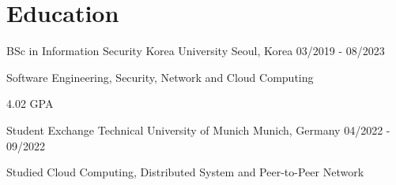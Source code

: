 \vspace{-\acvSectionTopSkip}
\section{Education}
\cventry
{BSc in Information Security} %
{Korea University} %
{Seoul, Korea} %
{03/2019 - 08/2023} %
\begin{cvitems}
\item {Software Engineering, Security, Network and Cloud Computing}
\item {4.02 GPA}
\end{cvitems}

\cventry
{Student Exchange} %
{Technical University of Munich} %
{Munich, Germany} %
{04/2022 - 09/2022} %
\begin{cvitems}
\item {Studied Cloud Computing, Distributed System and Peer-to-Peer Network}
\end{cvitems}
